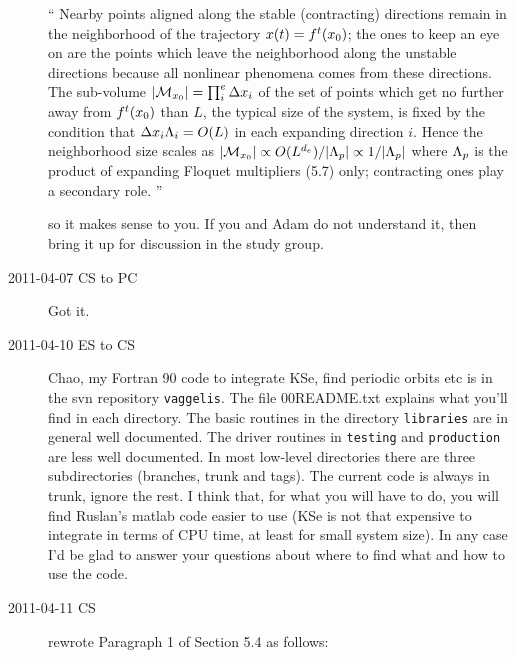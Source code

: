\begin{description}
``																\toCB
Nearby points aligned along the stable
(contracting) directions  remain in the neighborhood of the
trajectory $x(t)= {f^{t}({x_0})}$; the ones to keep an eye
on are the points which leave the neighborhood along the
unstable directions because all nonlinear phenomena comes 
from these directions. The sub-volume $ |{\cal M}_{{x_0}}| = \prod_i^e\Delta
x_i$ of the set of points which get no further away from
${f^{t}({x_0})}$ than $L$, the typical size of the system, is
fixed by the condition that $\Delta x_i \Lambda_i = O(L)$
in each expanding direction $i$. Hence the neighborhood size
scales as
$|{\cal M}_{{x_0}}| \propto O(L^{d_e})/|\Lambda_p| \propto 1/|\Lambda_p| $
where $\Lambda_p$ is the
product of expanding Floquet multipliers
(5.7) %
only;
contracting ones play a secondary role.
''

so it makes sense to you. If you and Adam do not understand it, then
bring it up for discussion in the study group.

\item[2011-04-07 CS to PC] Got it.


\item[2011-04-10 ES to CS] Chao, my Fortran 90 code to integrate KSe, find
periodic orbits etc is in the svn repository \texttt{vaggelis}. The file 00README.txt
explains what you'll find in each directory. The basic routines in the
directory \texttt{libraries} are in general well documented. The driver routines in
\texttt{testing} and \texttt{production} are less well documented. In most
low-level directories there are three subdirectories (branches, trunk and tags).
The current code is always in trunk, ignore the rest. I think that, for what you
will have to do, you will find Ruslan's matlab code easier to use (KSe is not that
expensive to integrate in terms of CPU time, at least for small system size). In any
case I'd be glad to answer your questions about where to find what and how to
use the code.

\item[2011-04-11 CS]
rewrote Paragraph 1 of Section 5.4 as follows:




\end{description}
